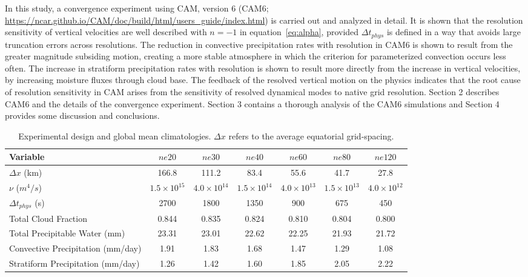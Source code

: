 \documentclass[times]{qjrms4}
\begin{document}
In this study, a convergence experiment using CAM, version 6 (CAM6; \url{https://ncar.github.io/CAM/doc/build/html/users_guide/index.html}) is carried out and analyzed in detail. It is shown that the resolution sensitivity of vertical velocities are well described with $n=-1$ in equation~\eqref{eq:alpha}, provided $\Delta t_{phys}$ is defined in a way that avoids large truncation errors across resolutions. The reduction in convective precipitation rates with resolution in CAM6 is shown to result from the greater magnitude subsiding motion, creating a more stable atmosphere in which the criterion for parameterized convection occurs less often. The increase in stratiform precipitation rates with resolution is shown to result more directly from the increase in vertical velocities, by increasing moisture fluxes through cloud base. The feedback of the resolved vertical motion on the physics indicates that the root cause of resolution sensitivity in CAM arises from the sensitivity of resolved dynamical modes to native grid resolution. Section 2 describes CAM6 and the details of the convergence experiment. Section 3 contains a thorough analysis of the CAM6 simulations and Section 4 provides some discussion and conclusions.
 
 \begin{table}
 \caption{Experimental design and global mean climatologies. $\Delta x$ refers to the average equatorial grid-spacing.}
 \centering
 \scriptsize
 \begin{tabular}{lcccccc}
   \hline
   Variable & $ne20$ & $ne30$ & $ne40$ & $ne60$ & $ne80$ & $ne120$ \\ 
   \hline
   $\Delta x$ (km) & 166.8 & 111.2 & 83.4 & 55.6 & 41.7 & 27.8 \\
   $\nu$ ($m^4/s$) & $1.5 \times 10^{15}$ & $4.0 \times 10^{14}$ & $1.5 \times 10^{14}$ & $4.0 \times 10^{13}$  & $1.5 \times 10^{13}$ & $4.0 \times 10^{12}$\\
    $\Delta t_{phys}$ (s) & 2700 & 1800 & 1350 & 900 & 675 & 450 \\
   Total Cloud Fraction & 0.844 & 0.835 & 0.824 & 0.810 & 0.804 & 0.800 \\ 
   Total Precipitable Water (mm) & 23.31& 23.01 & 22.62 & 22.25 & 21.93 & 21.72 \\
   Convective Precipitation (mm/day) & 1.91 & 1.83 & 1.68 & 1.47 & 1.29 & 1.08 \\
   Stratiform Precipitation (mm/day) & 1.26 & 1.42 & 1.60 & 1.85 & 2.05 & 2.22 \\      
 \hline
 \end{tabular}
 \label{tbl:table1}
 \end{table}
 
\end{document}

